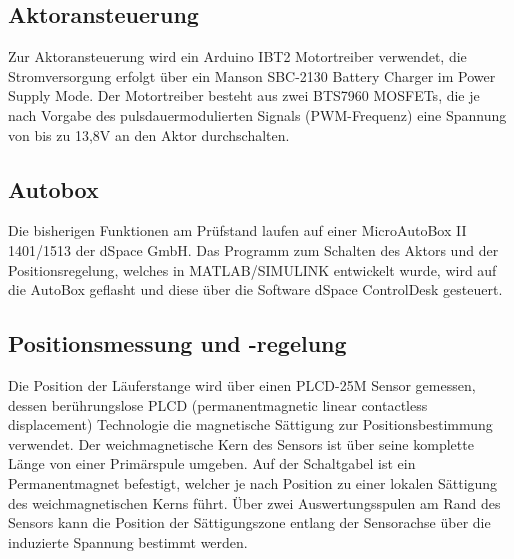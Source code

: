 \subsection{Aktoransteuerung}

Zur Aktoransteuerung wird ein Arduino IBT2 Motortreiber verwendet, die Stromversorgung erfolgt über ein Manson SBC-2130 Battery Charger im Power Supply Mode. Der Motortreiber besteht aus zwei BTS7960 MOSFETs, die je nach Vorgabe des pulsdauermodulierten Signals (PWM-Frequenz) eine Spannung von bis zu 13,8V an den Aktor durchschalten. 

\subsection{Autobox}

Die bisherigen Funktionen am Prüfstand laufen auf einer MicroAutoBox II 1401/1513 der dSpace GmbH. Das Programm zum Schalten des Aktors und der Positionsregelung, welches in MATLAB/SIMULINK entwickelt wurde, wird auf die AutoBox geflasht und diese über die Software dSpace ControlDesk gesteuert.

\subsection {Positionsmessung und -regelung}\label{regler}

Die Position der Läuferstange wird über einen PLCD-25M Sensor gemessen, dessen berührungslose PLCD (permanentmagnetic linear contactless displacement) Technologie die magnetische Sättigung zur Positionsbestimmung verwendet. Der weichmagnetische Kern des Sensors ist über seine komplette Länge von einer Primärspule umgeben. Auf der Schaltgabel ist ein Permanentmagnet befestigt, welcher je nach Position zu einer lokalen Sättigung des weichmagnetischen Kerns führt. Über zwei Auswertungsspulen am Rand des Sensors kann die Position der Sättigungszone entlang der Sensorachse über die induzierte Spannung bestimmt werden.

